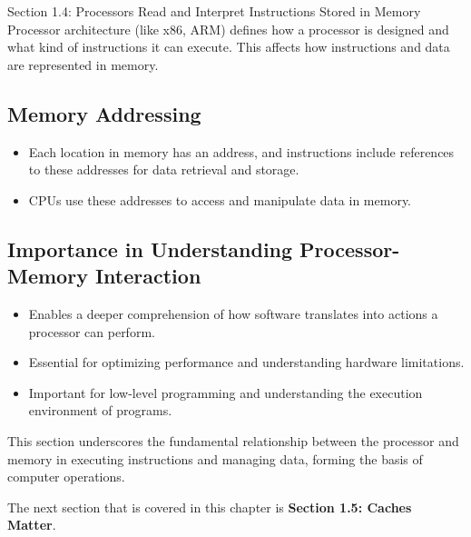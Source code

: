 \begin{notes}{Section 1.4: Processors Read and Interpret Instructions Stored in Memory}
    Processor architecture (like x86, ARM) defines how a processor is designed and what kind of instructions it can execute. This affects how instructions and data are represented in memory.
    
    \subsection*{Memory Addressing}

    \begin{itemize}
        \item Each location in memory has an address, and instructions include references to these addresses for data retrieval and storage.
        \item CPUs use these addresses to access and manipulate data in memory.
    \end{itemize}
    
    \subsection*{Importance in Understanding Processor-Memory Interaction}

    \begin{itemize}
        \item Enables a deeper comprehension of how software translates into actions a processor can perform.
        \item Essential for optimizing performance and understanding hardware limitations.
        \item Important for low-level programming and understanding the execution environment of programs.
    \end{itemize}
    
    This section underscores the fundamental relationship between the processor and memory in executing instructions and managing data, forming the basis of computer operations.
\end{notes}

The next section that is covered in this chapter is \textbf{Section 1.5: Caches Matter}.

